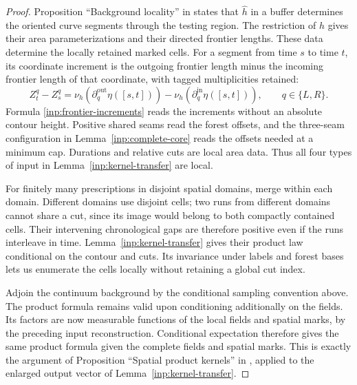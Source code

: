 \begin{proof}
Proposition ``Background locality'' in \cite{MetricMaps}
states that $\widehat h$ in a buffer determines the oriented curve
segments through the testing region.  The restriction of $h$
gives their area parameterizations and their directed frontier
lengths.  These data determine the locally retained marked cells.
For a segment from time $s$ to time $t$, its coordinate increment
is the outgoing frontier length minus the incoming frontier
length of that coordinate, with tagged multiplicities retained:
\begin{equation}\label{inp:frontier-increments}
 Z^q_t-Z^q_s
   =\nu_h(\partial_q^{\mathrm{out}}\eta([s,t]))
      -\nu_h(\partial_q^{\mathrm{in}}\eta([s,t])),
 \qquad q\in\{L,R\}.
\end{equation}
Formula \eqref{inp:frontier-increments} reads
the increments without an absolute contour height.  Positive
shared seams read the forest offsets, and the three-seam
configuration in Lemma~\ref{inp:complete-core} reads the offsets
needed at a minimum cap.  Durations and relative cuts are local
area data.  Thus all four types of input in
Lemma~\ref{inp:kernel-transfer} are local.

For finitely many prescriptions in disjoint spatial domains,
merge within each domain.  Different domains use disjoint cells;
two runs from different domains cannot share a cut, since its
image would belong to both compactly contained cells.  Their
intervening chronological gaps are therefore positive even if
the runs interleave in time.  Lemma~\ref{inp:kernel-transfer}
gives their product law conditional on the contour and cuts.
Its invariance under labels and forest bases lets us enumerate
the cells locally without retaining a global cut index.

Adjoin the continuum background by the conditional sampling
convention above.  The product formula remains valid upon
conditioning additionally on the fields.  Its factors are now
measurable functions of the local fields and spatial marks,
by the preceding input reconstruction.  Conditional expectation
therefore gives the same product formula given the complete
fields and spatial marks.  This is exactly the argument of
Proposition ``Spatial product kernels'' in \cite{MetricMaps}, applied to the
enlarged output vector of Lemma~\ref{inp:kernel-transfer}.


\end{proof}
